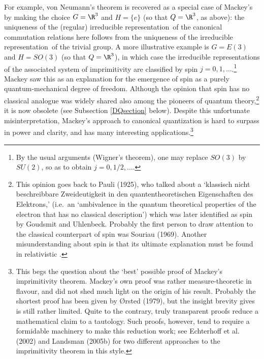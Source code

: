 \documentclass[12pt,titlepage]{article}
\newcommand{\irrep}{irreducible representation}
\begin{document}
For example, von Neumann's theorem is recovered as a special case of Mackey's by making  the choice $G=\R^3$ and $H=\{e\}$ (so that $Q=\R^3$, as above):
the uniqueness of the (regular) \irrep\ of the canonical commutation relations here  follows from the uniqueness of the \irrep\ of the trivial group.
 A more illustrative example is $G=E(3)$ and $H=SO(3)$ (so that $Q=\R^3$), in which case the \irrep s of the associated system of imprimitivity are classified by spin $j=0,1,\ldots$.\footnote{By the usual arguments (Wigner's theorem), one may replace $SO(3)$ by $SU(2)$, so as to obtain $j=0,1/2,\ldots$.} Mackey saw this as an explanation for the emergence of spin as a purely quantum-mechanical degree of freedom. Although the opinion that spin has no classical analogue  was widely shared also among the pioneers of quantum theory,\footnote{This opinion goes back to Pauli (1925), who talked about a `klassisch nicht beschreibbare Zweideutigkeit in den quantentheoretischen Eigenschaften des Elektrons,' (i.e.\ an `ambivalence in the quantum theoretical properties of the electron that has no classical description') which was later identified as spin by Goudsmit and Uhlenbeck. Probably the first person to draw attention to the classical counterpart of spin was Souriau (1969).
 Another misunderstanding about spin is that its ultimate explanation must be found in relativistic \qm.} it is now  obsolete (see Subsection \ref{DQsection} below). Despite this unfortunate misinterpretation, Mackey's approach to canonical quantization is hard to surpass in power and clarity, and has many interesting applications.\footnote{This begs the question about the `best' possible proof of Mackey's  imprimitivity theorem. Mackey's own proof was rather measure-theoretic in flavour, and did not shed much light on the origin of his result. Probably the shortest proof has been given by \O rsted (1979), 
but the insight brevity gives is still rather limited. Quite to the contrary, truly transparent proofs reduce a mathematical  claim to a tautology. Such proofs, however, tend to require a formidable machinery to make this reduction work; see  Echterhoff et al. (2002) and
Landsman (2005b) for two different approaches to the  imprimitivity theorem in this  style.}  
\end{document}
